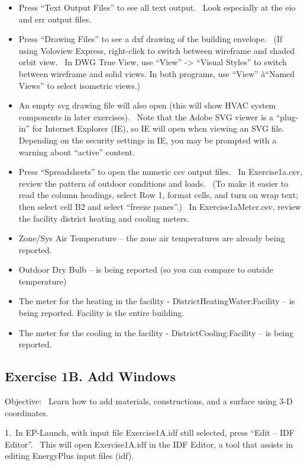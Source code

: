 \begin{itemize}
\item
  Press ``Text Output Files'' to see all text output.~ Look especially at the eio and err output files.
\item
  Press ``Drawing Files'' to see a dxf drawing of the building envelope.~ (If using Voloview Express, right-click to switch between wireframe and shaded orbit view.~ In DWG True View, use ``View'' -\textgreater{} ``Visual Styles'' to switch between wireframe and solid views. In both programs, use ``View'' à``Named Views'' to select isometric views.)
\item
  An empty svg drawing file will also open (this will show HVAC system components in later exercises).~ Note that the Adobe SVG viewer is a ``plug-in'' for Internet Explorer (IE), so IE will open when viewing an SVG file.~ Depending on the security settings in IE, you may be prompted with a warning about ``active'' content.
\item
  Press ``Spreadsheets'' to open the numeric csv output files.~ In Exercise1a.csv, review the pattern of outdoor conditions and loads.~ (To make it easier to read the column headings, select Row 1, format cells, and turn on wrap text; then select cell B2 and select ``freeze panes''.) ~In Exercise1aMeter.csv, review the facility district heating and cooling meters.
\item
  Zone/Sys Air Temperature -- the zone air temperatures are already being reported.
\item
  Outdoor Dry Bulb -- is being reported (so you can compare to outside temperature)
\item
  The meter for the heating in the facility - DistrictHeatingWater:Facility -- is being reported. Facility is the entire building.
\item
  The meter for the cooling in the facility - DistrictCooling:Facility -- is being reported.
\end{itemize}

\subsection{Exercise 1B. Add Windows}\label{exercise-1b.-add-windows}

Objective:~ Learn how to add materials, constructions, and a surface using 3-D coordinates.

1.~In EP-Launch, with input file Exercise1A.idf still selected, press ``Edit -- IDF Editor''.~ This will open Exercise1A.idf in the IDF Editor, a tool that assists in editing EnergyPlus input files (idf).

